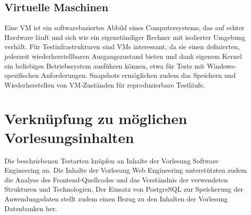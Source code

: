 \subsection{Virtuelle Maschinen}
Eine \ac{VM} ist ein softwarebasiertes Abbild eines Computersystems, das auf echter Hardware läuft und sich wie ein eigenständiger Rechner mit isolierter Umgebung verhält. Für Testinfrastrukturen sind \acp{VM} interessant, da sie einen definierten, jederzeit wiederherstellbaren Ausgangszustand bieten und dank eigenem Kernel ein beliebiges Betriebssystem ausführen können, etwa für Tests mit Windows-spezifischen Anforderungen. Snapshots ermöglichen zudem das Speichern und Wiederherstellen von \ac{VM}-Zuständen für reproduzierbare Testläufe.

\section{Verknüpfung zu möglichen Vorlesungsinhalten}
Die beschriebenen Testarten knüpfen an Inhalte der Vorlesung Software Engineering an. Die Inhalte der Vorlesung Web Engineering unterstützten zudem die Analyse des Frontend-Quellcodes und das Verständnis der verwendeten Strukturen und Technologien. Der Einsatz von PostgreSQL zur Speicherung der Anwendungsdaten stellt zudem einen Bezug zu den Inhalten der Vorlesung Datenbanken her.